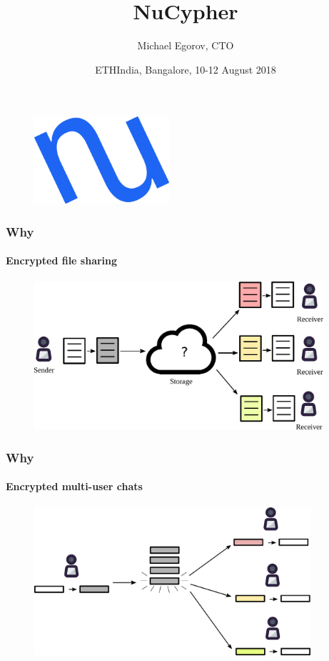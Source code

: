 \documentclass[xetex,mathsans,sans,aspectratio=169]{beamer}
\title[NuCypher]{NuCypher}
\author[Michael]{Michael Egorov, CTO}
\date[10.08.2018]{ETHIndia, Bangalore, 10-12 August 2018}
\begin{document}
    \begin{frame}
        \titlepage
        \begin{figure}
            \centering
            \includegraphics[width=5cm]{pdf/nucypher_logo.pdf}
        \end{figure}
    \end{frame}

    \begin{frame}
        \frametitle{Why}
        \framesubtitle{Encrypted file sharing}
        \begin{figure}
            \centering
            \includegraphics[height=5.5cm]{pdf/file-sharing.pdf}
        \end{figure}
    \end{frame}

    \begin{frame}
        \frametitle{Why}
        \framesubtitle{Encrypted multi-user chats}
        \begin{figure}
            \centering
            \includegraphics[height=5.5cm]{pdf/chats.pdf}
        \end{figure}
    \end{frame}
\end{document}
